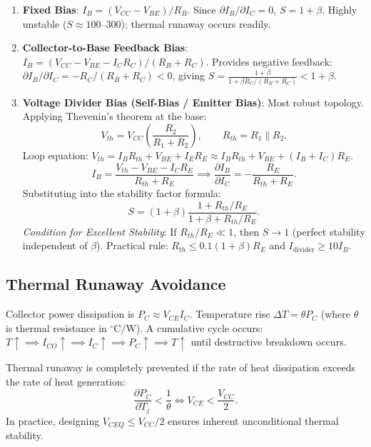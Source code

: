 \documentclass[12pt,a4paper]{article}
\begin{document}
\begin{enumerate}[leftmargin=1.5em, itemsep=3pt]
  \item \textbf{Fixed Bias}: $I_B = (V_{CC} - V_{BE})/R_B$. Since $\partial I_B/\partial I_C = 0$, $S = 1+\beta$. Highly unstable ($S \approx 100$--$300$); thermal runaway occurs readily.
  \item \textbf{Collector-to-Base Feedback Bias}: $I_B = (V_{CC} - V_{BE} - I_C R_C)/(R_B + R_C)$. Provides negative feedback: $\partial I_B/\partial I_C = -R_C/(R_B+R_C) < 0$, giving $S = \frac{1+\beta}{1 + \beta R_C/(R_B+R_C)} < 1+\beta$.
  \item \textbf{Voltage Divider Bias (Self-Bias / Emitter Bias)}: Most robust topology. Applying Thevenin's theorem at the base:
  \[
  V_{th} = V_{CC}\left(\frac{R_2}{R_1+R_2}\right),\qquad R_{th} = R_1 \parallel R_2.
  \]
  Loop equation: $V_{th} = I_B R_{th} + V_{BE} + I_E R_E \approx I_B R_{th} + V_{BE} + (I_B + I_C)R_E$.
  \[
  I_B = \frac{V_{th} - V_{BE} - I_C R_E}{R_{th} + R_E} \implies \frac{\partial I_B}{\partial I_C} = -\frac{R_E}{R_{th} + R_E}.
  \]
  Substituting into the stability factor formula:
  \[
  S = (1+\beta)\frac{1 + R_{th}/R_E}{1+\beta + R_{th}/R_E}.
  \]
  \textit{Condition for Excellent Stability}: If $R_{th}/R_E \ll 1$, then $S \to 1$ (perfect stability independent of $\beta$). Practical rule: $R_{th} \le 0.1(1+\beta)R_E$ and $I_{\mathrm{divider}} \ge 10 I_B$.
\end{enumerate}

\subsection{Thermal Runaway Avoidance}
Collector power dissipation is $P_C \approx V_{CE} I_C$. Temperature rise $\Delta T = \theta P_C$ (where $\theta$ is thermal resistance in $^\circ\mathrm{C/W}$). A cumulative cycle occurs: $T \uparrow \implies I_{CO} \uparrow \implies I_C \uparrow \implies P_C \uparrow \implies T \uparrow$ until destructive breakdown occurs.
\begin{tcolorbox}[formulabox, title={Condition to Prevent Thermal Runaway}]
Thermal runaway is completely prevented if the rate of heat dissipation exceeds the rate of heat generation:
\[
\frac{\partial P_C}{\partial T_j} < \frac{1}{\theta} \iff V_{CE} < \frac{V_{CC}}{2}.
\]
In practice, designing $V_{CEQ} \le V_{CC}/2$ ensures inherent unconditional thermal stability.
\end{tcolorbox}
\end{document}
